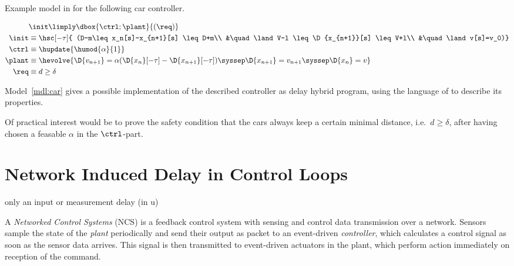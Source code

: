     \begin{algorithm}
        \caption{Example model in \ddL for the following car controller.}
        \label{mdl:car} %
        \begin{align*}
            &\init \limply \dbox{\ctrl;\plant}{(\req)}\\
            \init &\equiv \hsc[-\tau]{
                (D-m\leq x_n[s]-x_{n+1}[s] \leq D+m\\
                &\quad\land V-l \leq\D{x_{n+1}}[s] \leq V+l\\
                &\quad\land v[s]=v_0)}\\
            \ctrl &\equiv \hupdate{\humod{\alpha}{1}}\\
            \plant &\equiv \hevolve{
                \D{v_{n+1}} = \alpha(\D{x_n}[-\tau]-\D{x_{n+1}}[-\tau])\syssep
                \D{x_{n+1}} = v_{n+1}\syssep
                \D{x_n} = v
            }\\
            \req &\equiv d\geq \delta
        \end{align*}
    \end{algorithm}

    Model~\ref{mdl:car} gives a possible implementation of the described controller as delay hybrid program, using the language of \ddL to describe its properties.

    Of practical interest would be to prove the safety condition that the cars always keep a certain minimal distance, i.e.\ $d\geq\delta$, after having chosen a feasable $\alpha$ in the $\ctrl$-part.


\section{Network Induced Delay in Control Loops}

    only an input or measurement delay (in u)

    A \emph{Networked Control Systems} (NCS) is a feedback control system with sensing and control data transmission over a network.
    Sensors sample the state of the \emph{plant} periodically and send their output as packet to an event-driven \emph{controller}, which calculates a control signal as soon as the sensor data arrives. This signal is then transmitted to event-driven actuators in the plant, which perform action immediately on reception of the command.

